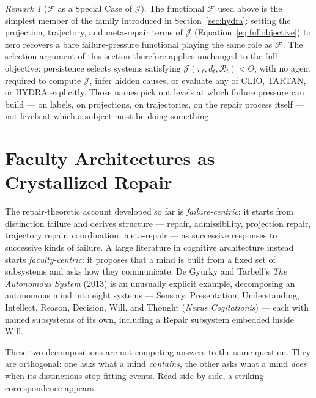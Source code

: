 \documentclass[11pt]{article}
\theoremstyle{plain}
\theoremstyle{definition}
\theoremstyle{remark}
\newtheorem{remark}[theorem]{Remark}
\begin{document}
\begin{remark}[$\mathcal{F}$ as a Special Case of $\mathcal{J}$]
The functional $\mathcal{F}$ used above is the simplest member of the family introduced in Section~\ref{sec:hydra}: setting the projection, trajectory, and meta-repair terms of $\mathcal{J}$ (Equation~\eqref{eq:fullobjective}) to zero recovers a bare failure-pressure functional playing the same role as $\mathcal{F}$. The selection argument of this section therefore applies unchanged to the full objective: persistence selects systems satisfying $\mathcal{J}(\pi_t,d_t,\mathcal{R}_t) < \Theta$, with no agent required to compute $\mathcal{J}$, infer hidden causes, or evaluate any of CLIO, TARTAN, or HYDRA explicitly. Those names pick out levels at which failure pressure can build --- on labels, on projections, on trajectories, on the repair process itself --- not levels at which a subject must be doing something.
\end{remark}

\section{Faculty Architectures as Crystallized Repair}
\label{sec:faculty}

The repair-theoretic account developed so far is \emph{failure-centric}: it starts from distinction failure and derives structure --- repair, admissibility, projection repair, trajectory repair, coordination, meta-repair --- as successive responses to successive kinds of failure. A large literature in cognitive architecture instead starts \emph{faculty-centric}: it proposes that a mind is built from a fixed set of subsystems and asks how they communicate. De Gyurky and Tarbell's \emph{The Autonomous System} (2013) is an unusually explicit example, decomposing an autonomous mind into eight systems --- Sensory, Presentation, Understanding, Intellect, Reason, Decision, Will, and Thought (\emph{Nexus Cogitationis}) --- each with named subsystems of its own, including a Repair subsystem embedded inside Will.

These two decompositions are not competing answers to the same question. They are orthogonal: one asks what a mind \emph{contains}, the other asks what a mind \emph{does} when its distinctions stop fitting events. Read side by side, a striking correspondence appears.
\end{document}
